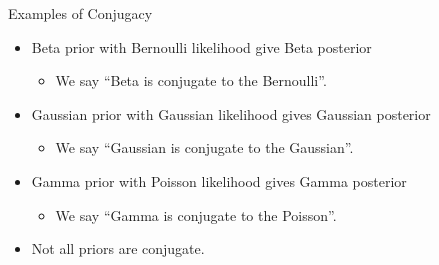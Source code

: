 \documentclass[10pt]{beamer}
\begin{document}
\begin{frame}{Examples of Conjugacy}
  \begin{itemize}
  \item Beta prior with Bernoulli likelihood give Beta posterior
    \begin{itemize}
    \item We say ``Beta is conjugate to the Bernoulli''.
    \end{itemize}

  \item Gaussian prior with Gaussian likelihood gives Gaussian posterior
    \begin{itemize}
    \item We say ``Gaussian is conjugate to the Gaussian''.
    \end{itemize}

  \item Gamma prior with Poisson likelihood gives Gamma posterior
    \begin{itemize}
    \item We say ``Gamma is conjugate to the Poisson''.
    \end{itemize}

  \item Not all priors are conjugate.
  \end{itemize}
\end{frame}
\end{document}
